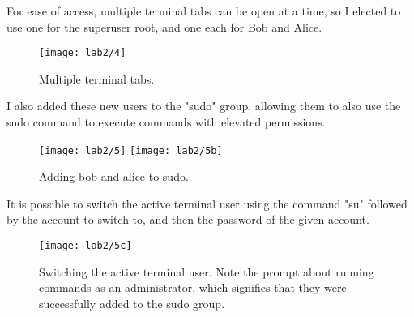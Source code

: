 
For ease of access, multiple terminal tabs can be open at a time, so I elected to use one for the superuser root,
and one each for Bob and Alice.

\begin{figure}[H]
    \centering
    \texttt{[image: lab2/4]}
    \caption{Multiple terminal tabs.}
    \label{fig:terminalTabs}
\end{figure}

I also added these new users to the "sudo" group, allowing them to also use the sudo command to execute commands
with elevated permissions.

\begin{figure}[H]
    \centering
    \texttt{[image: lab2/5]}
    \texttt{[image: lab2/5b]}
    \caption{Adding bob and alice to sudo.}
    \label{fig:sudoAdd1}
\end{figure}



It is possible to switch the active terminal user using the command "su" followed by the account to switch to,
and then the password of the given account.

\begin{figure}[H]
    \centering
    \texttt{[image: lab2/5c]}
    \caption{Switching the active terminal user. Note the prompt about running commands as an administrator,
    which signifies that they were successfully added to the sudo group.}
    \label{fig:suBobAlice}
\end{figure}

\pagebreak

